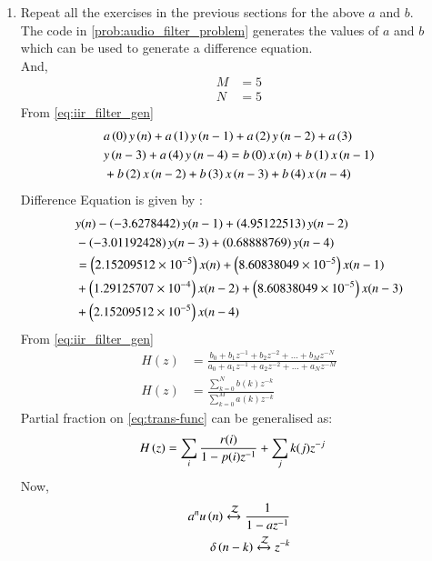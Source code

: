 \documentclass[journal,12pt,twocolumn]{IEEEtran}
\theoremstyle{remark}
\begin{document}
\begin{enumerate}[label=\thesection.\arabic*,ref=\thesection.\theenumi]
\item Repeat all the exercises in the previous sections for the above $a$ and $b$.\\
\solution The code in \ref{prob:audio_filter_problem} generates the values of $a$ and $b$  which can be used to generate a difference equation.\\
And,
\begin{align}
    M &= 5\\
    N&=5
\end{align}
From \ref{eq:iir_filter_gen} 
\begin{align}
    &a\left(0\right)y\left(n\right) + a\left(1\right)y\left(n-1\right)+a\left(2\right)y\left(n-2\right)+a\left(3\right)\\ \notag &y\left(n-3\right) + a\left(4\right)y\left(n-4\right) =   b\left(0\right)x\left(n\right) + b\left(1\right)x\left(n-1\right)\\ \notag &+b\left(2\right)x\left(n-2\right)+b\left(3\right)x\left(n-3\right) + b\left(4\right)x\left(n-4\right) 
\end{align}
Difference Equation is given by :
\begin{align}
	&y(n) - \left(-3.6278442\right)y(n - 1) + \left(4.95122513\right)y(n - 2) \nonumber \\
	&- \left(-3.01192428 \right)y(n - 3) + \left(0.68888769 \right)y(n - 4) \nonumber \\
	&= \left(2.15209512\times 10^{-5}\right)x(n) + \left(8.60838049 \times 10^{-5}\right)x(n - 1) \nonumber \\
	&+ \left(1.29125707\times 10^{-4}\right)x(n - 2) + \left(8.60838049\times 10^{-5}\right)x(n - 3) \nonumber \\
	&+ \left(2.15209512 \times 10^{-5}\right)x(n - 4)
\end{align}
From \eqref{eq:iir_filter_gen} 
\begin{align}
    H(z) &= \frac{b_0 + b_1 z^{-1} + b_2 z^{-2} + \ldots + b_M z^{-N}}{a_0 + a_1 z^{-1} + a_2 z^{-2} + \ldots + a_N z^{-M}}\\
    H(z) &= \frac{\sum_{k = 0}^{N}b(k)z^{-k}}{\sum_{k = 0}^{M}a(k)z^{-k}} \label{eq:trans-func}
\end{align}
Partial fraction on \eqref{eq:trans-func} can be generalised as:
\begin{align}
    H\left(z\right)&= \sum_{i}\frac{r(i)}{1 - p(i)z^{-1}} + \sum_{j}k(j)z^{-j}
	\label{eq:trans-func-pfe}
\end{align}
Now,
\begin{align}
    a^{n}u\brak{n} \xleftrightarrow{\mathcal{Z}} \frac{1}{1-az^{-1}} \label{eq:res-1}\\
    \delta\brak{n-k} \xleftrightarrow{\mathcal{Z}} z^{-k}\label{eq:res-2}

\end{align}
\end{enumerate}
\end{document}
